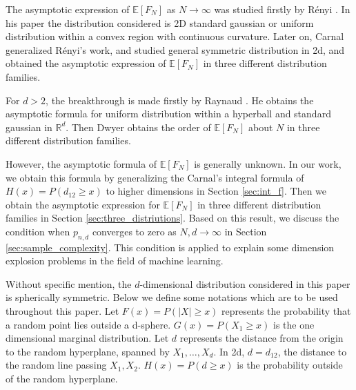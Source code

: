 \documentclass{aptpub}
\def\E{\mathbb{E}}
\begin{document}
The asymptotic expression of $\E[F_N]$ as $N\to \infty$
was studied firstly by R{\'e}nyi \cite{renyi1963konvexe}.
In his paper the distribution considered
is 2D standard gaussian or uniform distribution within a convex region with continuous curvature.
Later on, Carnal \cite{carnal1970konvexe} generalized R{\'e}nyi's work,
and studied general symmetric distribution in 2d,
and obtained the asymptotic expression of $\E[F_N]$
in three different distribution families.

For $d>2$, the breakthrough is made firstly by
Raynaud
\cite{raynaud1970enveloppe}.
He obtains the asymptotic formula for uniform distribution within a hyperball
and standard gaussian in $\mathbb{R}^d$.
Then Dwyer \cite{dwyer1991convex} obtains the order of $\E[F_N]$ about $N$
in three different distribution families.

However, the asymptotic formula of $\E[F_N]$ is generally unknown.
In our work, we obtain this formula by generalizing the Carnal's integral formula
of $H(x)=P(d_{12}\geq x)$ to higher dimensions in Section \ref{sec:int_f}.
Then we obtain the asymptotic
expression for $\E[F_N]$ in three different distribution families in Section \ref{sec:three_distriutions}.
Based on this result,
we discuss the condition when $p_{n,d}$ converges to zero as $N,d \to \infty$
in Section \ref{sec:sample_complexity}.
This condition is applied to explain some dimension explosion problems
in the field of machine learning.

Without specific mention, the $d$-dimensional distribution considered in this paper is spherically symmetric.
Below we define some notations which are to be used throughout this paper.
Let $F(x)=P(|X|\geq x)$ represents the probability that a random point lies outside
a d-sphere. $G(x)=P(X_1\geq x)$ is the one dimensional marginal distribution.
Let $d$ represents the distance from the origin to the random hyperplane, spanned by $X_1, \dots, X_d$.
In 2d, $d=d_{12}$, the distance to the random line passing $X_1, X_2$. $H(x)=P(d\geq x)$ is
the probability outside of the random hyperplane.
\end{document}
